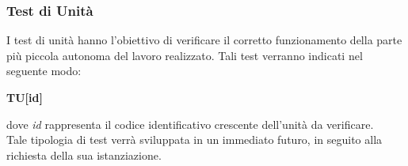 \subsubsection{Test di Unità}
I test di unità hanno l'obiettivo di verificare il corretto funzionamento della 
parte più piccola autonoma del lavoro realizzato. Tali test verranno indicati nel
seguente modo:\\
	\centerline{\textbf{TU[id]}}
dove \textit{id} rappresenta il codice identificativo crescente dell'unità da verificare.\\
Tale tipologia di test verrà sviluppata in un immediato futuro, in seguito alla richiesta della sua istanziazione.
